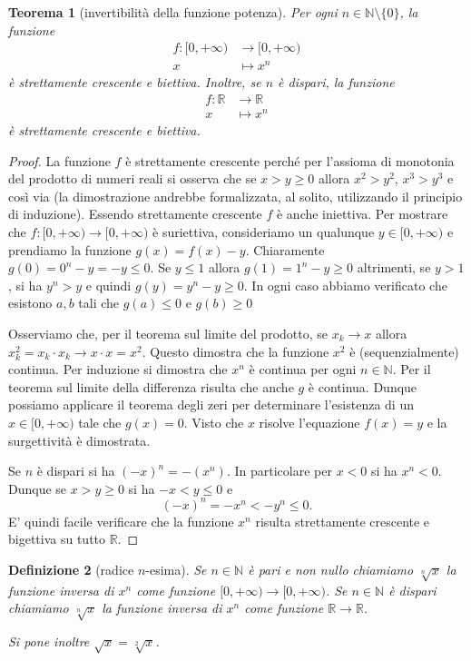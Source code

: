 \documentclass[italian,a4paper,oneside,headinclude]{scrbook}
\newcommand{\NN}{\mathbb N}
\newcommand{\RR}{\mathbb R}
\newtheorem{theorem}{Teorema}
\newtheorem{definition}[theorem]{Definizione}
\begin{document}
\begin{theorem}[invertibilità della funzione potenza]
Per ogni $n\in \NN\setminus\{0\}$, la funzione
\begin{align*}
  f\colon [0,+\infty) &\to [0,+\infty)\\
   x &\mapsto x^n
\end{align*}
è strettamente crescente e biettiva.
Inoltre, se $n$ è dispari, la funzione
\begin{align*}
  f\colon \RR & \to \RR\\
    x &\mapsto x^n
\end{align*}
è strettamente crescente e biettiva.
\end{theorem}
%
\begin{proof}
La funzione $f$ è strettamente crescente perché
per l'assioma di monotonia del prodotto di numeri reali si
osserva che
se $x>y\ge 0$ allora $x^2 > y^2$, $x^3 > y^3$ e così via
(la dimostrazione andrebbe formalizzata, al solito, utilizzando il principio di
induzione).
Essendo strettamente crescente $f$ è anche iniettiva.
Per mostrare che $f\colon [0,+\infty) \to [0,+\infty)$ è suriettiva, consideriamo
un qualunque $y\in[0,+\infty)$ e prendiamo la funzione $g(x)=f(x)-y$.
Chiaramente $g(0) = 0^n - y = -y \le 0$. Se $y\le 1$ allora $g(1) = 1^n - y \ge 0$
altrimenti, se $y>1$, si ha $y^n>y$ e quindi $g(y) = y^n-y \ge 0$.
In ogni caso abbiamo verificato che esistono $a,b$ tali che $g(a)\le 0$ e $g(b)\ge 0$

Osserviamo che, per il teorema sul limite del prodotto,
se $x_k \to x$ allora $x_k^2 = x_k\cdot x_k \to x\cdot x = x^2$.
Questo dimostra che la funzione $x^2$ è (sequenzialmente) continua.
Per induzione si dimostra che $x^n$ è continua per ogni $n\in \NN$.
Per il teorema sul limite della differenza risulta che anche $g$ è
continua.
Dunque possiamo applicare il teorema degli zeri
per determinare l'esistenza di un $x\in[0,+\infty)$ tale che $g(x)=0$.
Visto che $x$ risolve l'equazione $f(x)=y$ e la surgettività è dimostrata.

Se $n$ è dispari si ha $(-x)^n = -(x^n)$.
In particolare per $x<0$ si ha $x^n<0$. Dunque se $x> y \ge 0$ si
ha $-x < y \le 0$ e
\[
  (-x)^n = -x^n < -y^n \le 0.
\]
E' quindi facile verificare che la funzione $x^n$
risulta strettamente crescente e bigettiva su tutto $\RR$.
\end{proof}

\begin{definition}[radice $n$-esima]
Se $n\in \NN$ è pari e non nullo
chiamiamo $\sqrt[n]{x}$ la funzione
inversa di $x^n$ come funzione $[0,+\infty)\to [0,+\infty)$.
Se $n\in \NN$ è dispari chiamiamo $\sqrt[n]{x}$
la funzione inversa di $x^n$ come funzione $\RR \to \RR$.

Si pone inoltre $\sqrt{x} = \sqrt[2]{x}$.
\end{definition}
\end{document}
